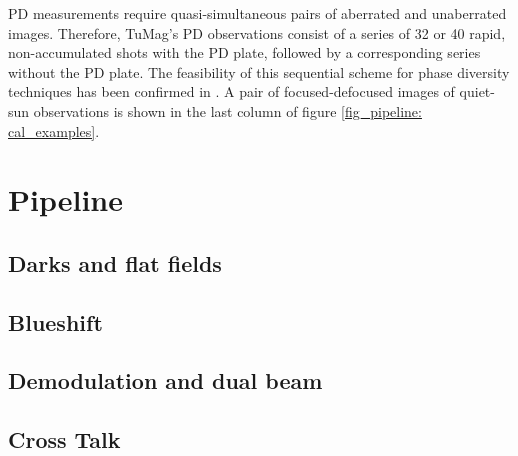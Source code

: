 PD measurements require quasi-simultaneous pairs of aberrated and unaberrated images. Therefore, TuMag's PD observations consist of a series of 32 or 40 rapid, non-accumulated shots with the PD plate, followed by a corresponding series without the PD plate. The feasibility of this sequential scheme for phase diversity techniques has been confirmed in \cite{PD_sequential}. A pair of focused-defocused images of quiet-sun observations is shown in the last column of figure \ref{fig_pipeline: cal_examples}.   


\section{Pipeline}
\subsection{Darks and flat fields}
\subsection{Blueshift}
\subsection{Demodulation and dual beam}
\subsection{Cross Talk}

